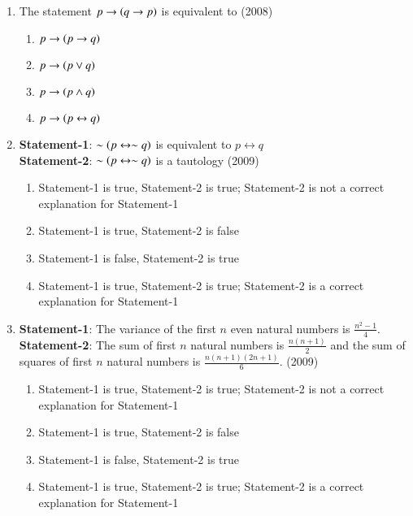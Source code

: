 \documentclass[journal]{IEEEtran}
\begin{document}
\begin{enumerate}
    \item The statement $p \to \left(q \to p\right)$ is equivalent to
        \hfill (2008)

        \begin{multicols}{2}
            \begin{enumerate}
                \item $p \to \left(p \to q\right)$
                \item $p \to \left(p \lor q\right)$
                \item $p \to \left(p \land q\right)$
                \item $p \to \left(p \leftrightarrow q\right)$
            \end{enumerate}
        \end{multicols}
        
    \item \textbf{Statement-1}: $\sim \left(p \leftrightarrow \sim q\right)$ is
        equivalent to $p \leftrightarrow q$ \\
        \textbf{Statement-2}: $\sim \left(p \leftrightarrow \sim q\right)$
        is a tautology
        \hfill (2009)
        
        \begin{enumerate}
            \item Statement-1 is true, Statement-2 is true;
                Statement-2 is not a correct explanation for Statement-1
            \item Statement-1 is true, Statement-2 is false
            \item Statement-1 is false, Statement-2 is true
            \item Statement-1 is true, Statement-2 is true;
                Statement-2 is a correct explanation for Statement-1       
        \end{enumerate}

    \item \textbf{Statement-1}: The variance of the first $n$ even
        natural numbers is $\frac {n^2 - 1} {4}$. \\
        \textbf{Statement-2}: The sum of first $n$ natural numbers
        is $\frac {n(n + 1)} {2}$ and the sum of squares of first
        $n$ natural numbers is $\frac {n(n+1)(2n+1)} {6}$.
        \hfill (2009)

        \begin{enumerate}
            \item Statement-1 is true, Statement-2 is true;
                Statement-2 is not a correct explanation for Statement-1
            \item Statement-1 is true, Statement-2 is false
            \item Statement-1 is false, Statement-2 is true
            \item Statement-1 is true, Statement-2 is true;
                Statement-2 is a correct explanation for Statement-1       
        \end{enumerate}


\end{enumerate}
\end{document}
